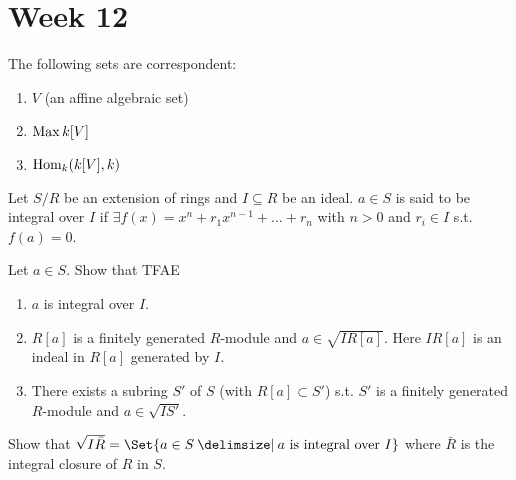 
\section{Week 12}

\begin{exercise}
  The following sets are correspondent:
  \begin{enumerate}[(1)]
    \item $V$ (an affine algebraic set)
    \item $\operatorname{Max} k[V]$
    \item $\operatorname{Hom}_k(k[V], k)$
  \end{enumerate}
\end{exercise}

\begin{definition}
  Let $S/R$ be an extension of rings and $I \subseteq R$ be an ideal.
  $a \in S$ is said to be integral over $I$ if $\exists f(x) = x^n + r_1x^{n-1}
  + \dots + r_n$ with $n > 0$ and $r_i \in I$ s.t. $f(a) = 0$.
\end{definition}

\begin{exercise}
  Let $a \in S$. Show that TFAE
  \begin{enumerate}[(1)]
    \item $a$ is integral over $I$.
    \item $R[a]$ is a finitely generated $R$-module and $a \in \sqrt{IR[a]}$.
      Here $IR[a]$ is an indeal in $R[a]$ generated by $I$.
    \item There exists a subring $S'$ of $S$ (with $R[a] \subset S'$)
      s.t. $S'$ is a finitely generated $R$-module and $a \in \sqrt{IS'}$.
  \end{enumerate}
\end{exercise}

\begin{exercise}
  Show that $\sqrt{I\bar{R}} = \Set{a \in S \given a \text{~is integral over~} I}$
  where $\bar{R}$ is the integral closure of $R$ in $S$.
\end{exercise}

